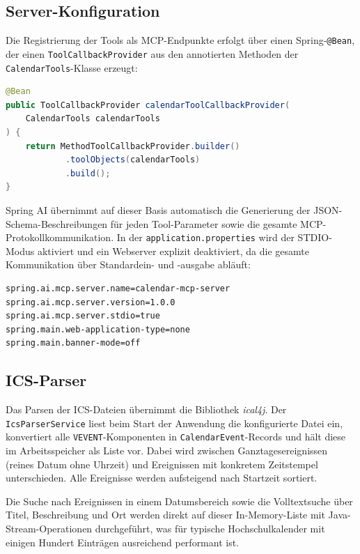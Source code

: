 \subsection{Server-Konfiguration}

Die Registrierung der Tools als MCP-Endpunkte erfolgt über einen Spring-\texttt{@Bean},
der einen \texttt{ToolCallbackProvider} aus den annotierten Methoden der
\texttt{CalendarTools}-Klasse erzeugt:

\begin{lstlisting}[language=java, caption={Registrierung der Tools als MCP-Server-Endpunkt}]
@Bean
public ToolCallbackProvider calendarToolCallbackProvider(
    CalendarTools calendarTools
) {
    return MethodToolCallbackProvider.builder()
            .toolObjects(calendarTools)
            .build();
}
\end{lstlisting}

Spring AI übernimmt auf dieser Basis automatisch die Generierung der JSON-Schema-Beschreibungen
für jeden Tool-Parameter sowie die gesamte MCP-Protokollkommunikation. In der
\texttt{application.properties} wird der STDIO-Modus aktiviert und ein Webserver explizit
deaktiviert, da die gesamte Kommunikation über Standard\-ein- und -ausgabe abläuft:

\begin{lstlisting}[caption={Relevante Konfigurationseinstellungen}]
spring.ai.mcp.server.name=calendar-mcp-server
spring.ai.mcp.server.version=1.0.0
spring.ai.mcp.server.stdio=true
spring.main.web-application-type=none
spring.main.banner-mode=off
\end{lstlisting}

\subsection{ICS-Parser}

Das Parsen der ICS-Dateien übernimmt die Bibliothek \emph{ical4j}. Der
\texttt{IcsParserService} liest beim Start der Anwendung die konfigurierte Datei ein,
konvertiert alle \texttt{VEVENT}-Komponenten in \texttt{CalendarEvent}-Records und
hält diese im Arbeitsspeicher als Liste vor. Dabei wird zwischen Ganztages\-ereignissen
(reines Datum ohne Uhrzeit) und Ereignissen mit konkretem Zeitstempel unterschieden.
Alle Ereignisse werden aufsteigend nach Startzeit sortiert.

Die Suche nach Ereignissen in einem Datumsbereich sowie die Volltextsuche über Titel,
Beschreibung und Ort werden direkt auf dieser In-Memory-Liste mit Java-Stream-Operationen
durchgeführt, was für typische Hochschulkalender mit einigen Hundert Einträgen ausreichend
performant ist.

